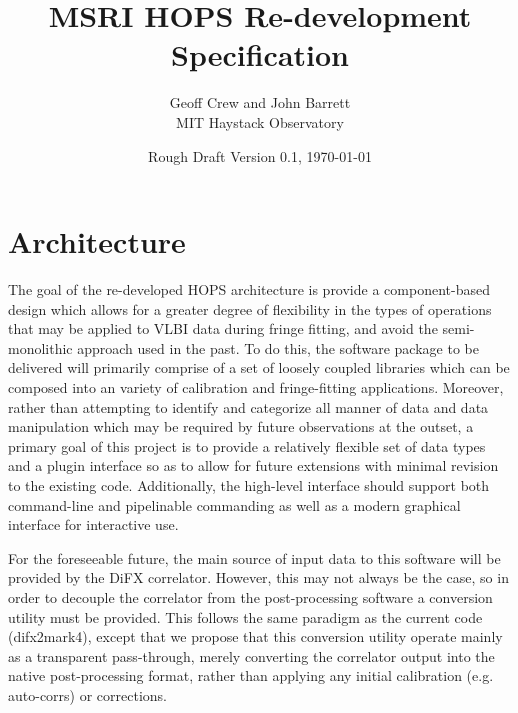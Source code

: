 \documentclass[hidelinks]{article}
\title{ \textbf{MSRI HOPS Re-development Specification} }
\author{
\large Geoff Crew and John Barrett \\
\Large MIT Haystack Observatory}
\date{Rough Draft Version 0.1, \today}
\let\Oldsection\section
\renewcommand{\section}{\FloatBarrier\Oldsection}
\begin{document}
\maketitle


\tiny
\tableofcontents
\normalsize
\newpage



\section{Architecture}

The goal of the re-developed HOPS architecture is provide a component-based design which allows for a greater degree of flexibility 
in the types of operations that may be applied to VLBI data during fringe fitting, and avoid the semi-monolithic approach used in the past.
To do this, the software package to be delivered will primarily comprise of a set of loosely coupled libraries which can be composed
into an variety of calibration and fringe-fitting applications. Moreover, rather than attempting to identify and categorize all manner of data
and data manipulation which may be required by future observations at the outset, a primary goal of this project is to provide a
relatively flexible set of data types and a plugin interface so as to allow for future extensions with minimal revision to the existing code.
Additionally, the high-level interface should support both command-line and pipelinable commanding as well as a modern graphical interface
for interactive use.

For the foreseeable future, the main source of input data to this software will be provided by the DiFX correlator. However, this may not always 
be the case, so in order to decouple the correlator from the post-processing software a conversion utility must be provided. This follows
the same paradigm as the current code (difx2mark4), except that we propose that this conversion utility operate mainly as a transparent pass-through, merely
converting the correlator output into the native post-processing format, rather than applying any initial calibration (e.g. auto-corrs) or corrections.
\end{document}
